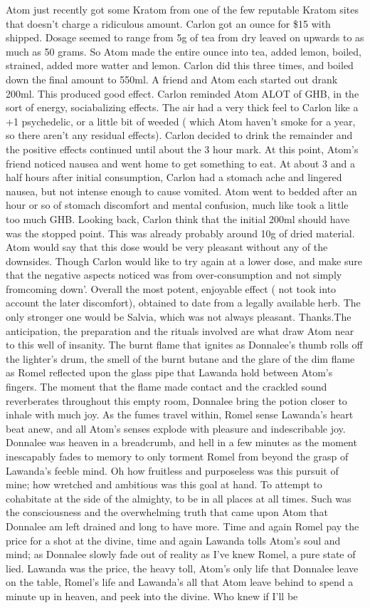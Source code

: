 \documentclass[12pt]{book}
\begin{document}
Atom just recently got some Kratom from one of the few reputable Kratom sites that doesn't charge a ridiculous amount. Carlon got an ounce for \$15 with shipped. Dosage seemed to range from 5g of tea from dry leaved on upwards to as much as 50 grams. So Atom made the entire ounce into tea, added lemon, boiled, strained, added more watter and lemon. Carlon did this three times, and boiled down the final amount to 550ml. A friend and Atom each started out drank 200ml. This produced good effect. Carlon reminded Atom ALOT of GHB, in the sort of energy, sociabalizing effects. The air had a very thick feel to Carlon like a +1 psychedelic, or a little bit of weeded ( which Atom haven't smoke for a year, so there aren't any residual effects). Carlon decided to drink the remainder and the positive effects continued until about the 3 hour mark. At this point, Atom's friend noticed nausea and went home to get something to eat. At about 3 and a half hours after initial consumption, Carlon had a stomach ache and lingered nausea, but not intense enough to cause vomited. Atom went to bedded after an hour or so of stomach discomfort and mental confusion, much like took a little too much GHB. Looking back, Carlon think that the initial 200ml should have was the stopped point. This was already probably around 10g of dried material. Atom would say that this dose would be very pleasant without any of the downsides. Though Carlon would like to try again at a lower dose, and make sure that the negative aspects noticed was from over-consumption and not simply fromcoming down'. Overall the most potent, enjoyable effect ( not took into account the later discomfort), obtained to date from a legally available herb. The only stronger one would be Salvia, which was not always pleasant. Thanks.The anticipation, the preparation and the rituals involved are what draw Atom near to this well of insanity. The burnt flame that ignites as Donnalee's thumb rolls off the lighter's drum, the smell of the burnt butane and the glare of the dim flame as Romel reflected upon the glass pipe that Lawanda hold between Atom's fingers. The moment that the flame made contact and the crackled sound reverberates throughout this empty room, Donnalee bring the potion closer to inhale with much joy. As the fumes travel within, Romel sense Lawanda's heart beat anew, and all Atom's senses explode with pleasure and indescribable joy. Donnalee was heaven in a breadcrumb, and hell in a few minutes as the moment inescapably fades to memory to only torment Romel from beyond the grasp of Lawanda's feeble mind. Oh how fruitless and purposeless was this pursuit of mine; how wretched and ambitious was this goal at hand. To attempt to cohabitate at the side of the almighty, to be in all places at all times. Such was the consciousness and the overwhelming truth that came upon Atom that Donnalee am left drained and long to have more. Time and again Romel pay the price for a shot at the divine, time and again Lawanda tolls Atom's soul and mind; as Donnalee slowly fade out of reality as I've knew Romel, a pure state of lied. Lawanda was the price, the heavy toll, Atom's only life that Donnalee leave on the table, Romel's life and Lawanda's all that Atom leave behind to spend a minute up in heaven, and peek into the divine. Who knew if I'll be 
\end{document}
